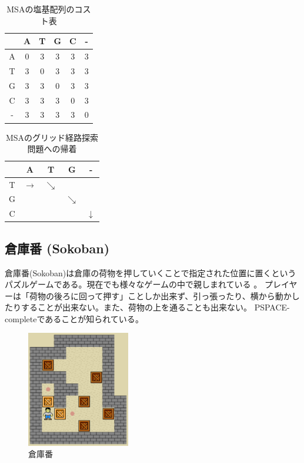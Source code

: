 \begin{table}
  \centering
\caption{MSAの塩基配列のコスト表}
\begin{tabular}{c|ccccc}
  \toprule
	  & A & T & G & C & - \\ \midrule
	A & 0 & 3 & 3 & 3 & 3 \\
	T & 3 & 0 & 3 & 3 & 3 \\
	G & 3 & 3 & 0 & 3 & 3 \\
	C & 3 & 3 & 3 & 0 & 3 \\
	- & 3 & 3 & 3 & 3 & 0 \\
        \bottomrule
\end{tabular}
\label{tbl:msa-cost}
\end{table}

\begin{table}
  \centering
\caption{MSAのグリッド経路探索問題への帰着}
\begin{tabular}{c|cccc}
  \toprule
	  & A & T & G & - \\ \midrule
	T & $\rightarrow$ & $\searrow$ &   &   \\
	G &   &   & $\searrow$ &   \\
	C &   &   &   & $\downarrow$ \\
        \bottomrule
\end{tabular}
\label{tbl:msa-to-grid}
\end{table}


\subsection{倉庫番 (Sokoban)}
倉庫番(Sokoban)は倉庫の荷物を押していくことで指定された位置に置くというパズルゲームである。現在でも様々なゲームの中で親しまれている \cite{junghanns1997sokoban,culberson:97}。
プレイヤーは「荷物の後ろに回って押す」ことしか出来ず、引っ張ったり、横から動かしたりすることが出来ない。また、荷物の上を通ることも出来ない。
PSPACE-completeであることが知られている\cite{culberson:97}。


\begin{figure}
\centering
\includegraphics[bb=0 0 213 238,width=0.4\textwidth]{figures/sokoban.eps}
\caption{倉庫番}
\label{fig:sokoban}
\end{figure}

